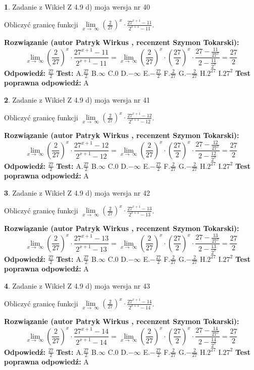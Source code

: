 \documentclass[12pt, a4paper]{article}
\theoremstyle{definition} %
\newtheorem{zad}{}
\newcommand{\zadStart}[1]{\begin{zad}#1\newline}
\newcommand{\zadStop}{\end{zad}}
\newcommand{\rozwStart}[2]{\noindent \textbf{Rozwiązanie (autor #1 , recenzent #2): }\newline}
\newcommand{\rozwStop}{\newline}
\newcommand{\odpStart}{\noindent \textbf{Odpowiedź:}\newline}
\newcommand{\odpStop}{\newline}
\newcommand{\testStart}{\noindent \textbf{Test:}\newline}
\newcommand{\testStop}{\newline}
\newcommand{\kluczStart}{\noindent \textbf{Test poprawna odpowiedź:}\newline}
\newcommand{\kluczStop}{\newline}
\begin{document}
\zadStart{Zadanie z Wikieł Z 4.9 d) moja wersja nr 40}


Obliczyć granicę funkcji  $\lim\limits_{x\to\ \infty}(\frac{2}{27})^{x}\cdot\frac{27^{x+1}-11}{2^{x+1}-11}$.
\zadStop
\rozwStart{Patryk Wirkus}{Szymon Tokarski}
$$\lim\limits_{x\to\ \infty}(\frac{2}{27})^{x}\cdot\frac{27^{x+1}-11}{2^{x+1}-11}=\lim\limits_{x\to\ \infty}(\frac{2}{27})^{x}\cdot(\frac{27}{2})^{x} \cdot \frac{27-\frac{11}{27^{x}}}{2-\frac{11}{2^{x}}} = \frac{27}{2}$$
\rozwStop
\odpStart
$\frac{27}{2}$
\odpStop
\testStart
A.$\frac{27}{2}$ B.$\infty$ C.$0$ D.$-\infty$ E.$-\frac{27}{2}$
F.$\frac{2}{27}$ G.$-\frac{2}{27}$
H.$2^{27}$
I.$27^{2}$
\testStop
\kluczStart
A
\kluczStop



\zadStart{Zadanie z Wikieł Z 4.9 d) moja wersja nr 41}


Obliczyć granicę funkcji  $\lim\limits_{x\to\ \infty}(\frac{2}{27})^{x}\cdot\frac{27^{x+1}-12}{2^{x+1}-12}$.
\zadStop
\rozwStart{Patryk Wirkus}{Szymon Tokarski}
$$\lim\limits_{x\to\ \infty}(\frac{2}{27})^{x}\cdot\frac{27^{x+1}-12}{2^{x+1}-12}=\lim\limits_{x\to\ \infty}(\frac{2}{27})^{x}\cdot(\frac{27}{2})^{x} \cdot \frac{27-\frac{12}{27^{x}}}{2-\frac{12}{2^{x}}} = \frac{27}{2}$$
\rozwStop
\odpStart
$\frac{27}{2}$
\odpStop
\testStart
A.$\frac{27}{2}$ B.$\infty$ C.$0$ D.$-\infty$ E.$-\frac{27}{2}$
F.$\frac{2}{27}$ G.$-\frac{2}{27}$
H.$2^{27}$
I.$27^{2}$
\testStop
\kluczStart
A
\kluczStop



\zadStart{Zadanie z Wikieł Z 4.9 d) moja wersja nr 42}


Obliczyć granicę funkcji  $\lim\limits_{x\to\ \infty}(\frac{2}{27})^{x}\cdot\frac{27^{x+1}-13}{2^{x+1}-13}$.
\zadStop
\rozwStart{Patryk Wirkus}{Szymon Tokarski}
$$\lim\limits_{x\to\ \infty}(\frac{2}{27})^{x}\cdot\frac{27^{x+1}-13}{2^{x+1}-13}=\lim\limits_{x\to\ \infty}(\frac{2}{27})^{x}\cdot(\frac{27}{2})^{x} \cdot \frac{27-\frac{13}{27^{x}}}{2-\frac{13}{2^{x}}} = \frac{27}{2}$$
\rozwStop
\odpStart
$\frac{27}{2}$
\odpStop
\testStart
A.$\frac{27}{2}$ B.$\infty$ C.$0$ D.$-\infty$ E.$-\frac{27}{2}$
F.$\frac{2}{27}$ G.$-\frac{2}{27}$
H.$2^{27}$
I.$27^{2}$
\testStop
\kluczStart
A
\kluczStop



\zadStart{Zadanie z Wikieł Z 4.9 d) moja wersja nr 43}


Obliczyć granicę funkcji  $\lim\limits_{x\to\ \infty}(\frac{2}{27})^{x}\cdot\frac{27^{x+1}-14}{2^{x+1}-14}$.
\zadStop
\rozwStart{Patryk Wirkus}{Szymon Tokarski}
$$\lim\limits_{x\to\ \infty}(\frac{2}{27})^{x}\cdot\frac{27^{x+1}-14}{2^{x+1}-14}=\lim\limits_{x\to\ \infty}(\frac{2}{27})^{x}\cdot(\frac{27}{2})^{x} \cdot \frac{27-\frac{14}{27^{x}}}{2-\frac{14}{2^{x}}} = \frac{27}{2}$$
\rozwStop
\odpStart
$\frac{27}{2}$
\odpStop
\testStart
A.$\frac{27}{2}$ B.$\infty$ C.$0$ D.$-\infty$ E.$-\frac{27}{2}$
F.$\frac{2}{27}$ G.$-\frac{2}{27}$
H.$2^{27}$
I.$27^{2}$
\testStop
\kluczStart
A
\kluczStop
\end{document}
